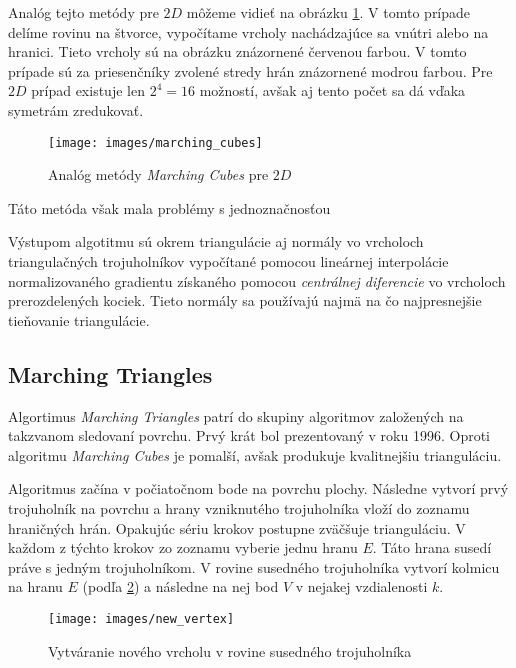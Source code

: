 Analóg tejto metódy pre $2D$ môžeme vidieť na obrázku \ref{obr:marching_cubes}. V tomto prípade delíme rovinu na štvorce, 
vypočítame vrcholy nachádzajúce sa vnútri alebo na hranici. Tieto vrcholy sú na obrázku znázornené 
červenou farbou. V tomto prípade sú za priesenčníky zvolené stredy hrán znázornené modrou farbou. 
Pre $2D$ prípad existuje len $2^4 = 16$ možností, avšak aj tento počet sa dá vďaka symetrám zredukovať.


\begin{figure}
    \centerline{\texttt{[image: images/marching\_cubes]}}
    \caption[Analóg metódy \textit{Marching Cubes} pre $2D$]{Analóg metódy \textit{Marching Cubes} pre $2D$}
    \label{obr:marching_cubes}
\end{figure}

Táto metóda však mala problémy s jednoznačnosťou 

Výstupom algotitmu sú okrem triangulácie aj normály vo vrcholoch triangulačných trojuholníkov vypočítané pomocou lineárnej
interpolácie normalizovaného gradientu získaného pomocou \textit{centrálnej diferencie} vo vrcholoch prerozdelených kociek. 
Tieto normály sa používajú najmä na čo najpresnejšie tieňovanie triangulácie.


\subsection{Marching Triangles}

Algortimus \textit{Marching Triangles} \cite{hilton1996marching} patrí do skupiny algoritmov založených na takzvanom 
sledovaní povrchu. Prvý krát bol prezentovaný v roku 1996. Oproti algoritmu \textit{Marching Cubes} je pomalší, avšak
produkuje kvalitnejšiu trianguláciu. 

Algoritmus začína v počiatočnom bode na povrchu plochy. Následne vytvorí prvý trojuholník na povrchu a hrany vzniknutého 
trojuholníka vloží do zoznamu hraničných hrán. 
Opakujúc sériu krokov postupne zväčšuje trianguláciu. V každom z týchto krokov zo zoznamu vyberie jednu hranu $E$. 
Táto hrana susedí práve s jedným trojuholníkom. V rovine susedného trojuholníka vytvorí kolmicu na hranu $E$
(podľa \ref{obr:new_vertex}) a následne na nej bod $V$ v nejakej vzdialenosti $k$. 

\begin{figure}
    \centerline{\texttt{[image: images/new\_vertex]}}
    \caption[Vytváranie nového vrcholu $V$ v rovine susedného trojuholníka]{Vytváranie nového vrcholu v rovine susedného trojuholníka}
    \label{obr:new_vertex}
\end{figure}

